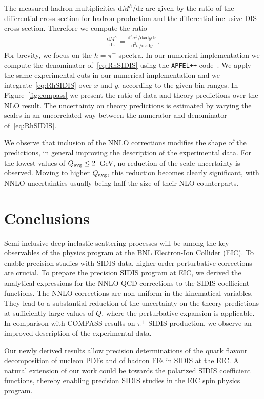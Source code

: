 \documentclass[10pt,aps,prl,twocolumn,preprintnumbers,nofootinbib]{revtex4-2}
\newcommand{\Qavg}{Q_{\rm avg}}
\newcommand{\der}{\mathrm{d}}
\newcommand{\code}[1]{\texttt{#1}}
\begin{document}
 
The measured hadron multiplicities $\der M^h/\der z$ are given by the ratio of
the differential cross section for hadron production and the differential
inclusive DIS cross section. Therefore we compute the ratio
\begin{align}\label{eq:RhSIDIS}
\frac{\der M^h}{\der z} = \frac{\der^3 \sigma^h/\der x\der y \der z}{\der^2 \sigma/\der x\der y} \, .
\end{align} 
For brevity, we focus on the $h=\pi^+$ spectra.  In our numerical implementation
we compute the denominator of~\eqref{eq:RhSIDIS} using the \code{APFEL++}
code~\cite{Bertone:2013vaa,Bertone:2017gds}.  We apply the same experimental
cuts in our numerical implementation and we integrate~\eqref{eq:RhSIDIS} over
$x$ and $y$, according to the given bin ranges. In Figure~\ref{fig:compass} we
present the ratio of data and theory predictions over the NLO result.  The
uncertainty on theory predictions is estimated by varying the scales in an
uncorrelated way between the numerator and denominator of~\eqref{eq:RhSIDIS}.

We observe that inclusion of the NNLO corrections modifies the shape of the
predictions, in general improving the description of the experimental data.  For
the lowest values of $\Qavg \leq 2$~GeV, no reduction of the scale uncertainty
is observed. Moving to higher $\Qavg$, this reduction becomes clearly
significant, with NNLO uncertainties usually being half the size of their NLO
counterparts.
 

\section{Conclusions}
Semi-inclusive deep inelastic scattering processes will be among the key
observables of the physics program at the BNL Electron-Ion Collider (EIC).
To enable precision studies
with SIDIS data, higher order perturbative corrections are crucial. To prepare
the precision SIDIS program at EIC, we derived the analytical expressions for
the NNLO QCD corrections to the SIDIS coefficient functions. The NNLO
corrections are non-uniform in the kinematical variables. They lead to a
substantial reduction of the uncertainty on the theory predictions at
sufficiently large values of $Q$, where the perturbative expansion is
applicable. In comparison with COMPASS results on $\pi^+$ SIDIS production, we
observe an improved description of the experimental data.

Our newly derived results allow precision determinations of the quark flavour
decomposition of nucleon PDFs and of hadron FFs in SIDIS at the EIC. A natural
extension of our work could be towards the polarized SIDIS coefficient
functions, thereby enabling precision SIDIS studies in the EIC spin physics
program.
\end{document}
